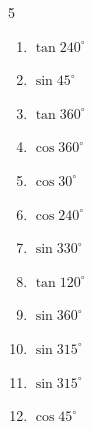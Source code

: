 \begin{multicols}{5}
\begin{enumerate}
  \item $\displaystyle \tan{240^\circ}$


  \item $\displaystyle \sin{45^\circ}$


\columnbreak %

\resetques

  \item $\displaystyle \tan{360^\circ}$

        \phantom{$\displaystyle =0$}

  \item $\displaystyle \cos{360^\circ}$

        \phantom{$\displaystyle =1$}

  \item $\displaystyle \cos{30^\circ}$


  \item $\displaystyle \cos{240^\circ}$


  \item $\displaystyle \sin{330^\circ}$


  \item $\displaystyle \tan{120^\circ}$


  \item $\displaystyle \sin{360^\circ}$

        \phantom{$\displaystyle =0$}

  \item $\displaystyle \sin{315^\circ}$


  \item $\displaystyle \sin{315^\circ}$


  \item $\displaystyle \cos{45^\circ}$



\end{enumerate}
\end{multicols}
